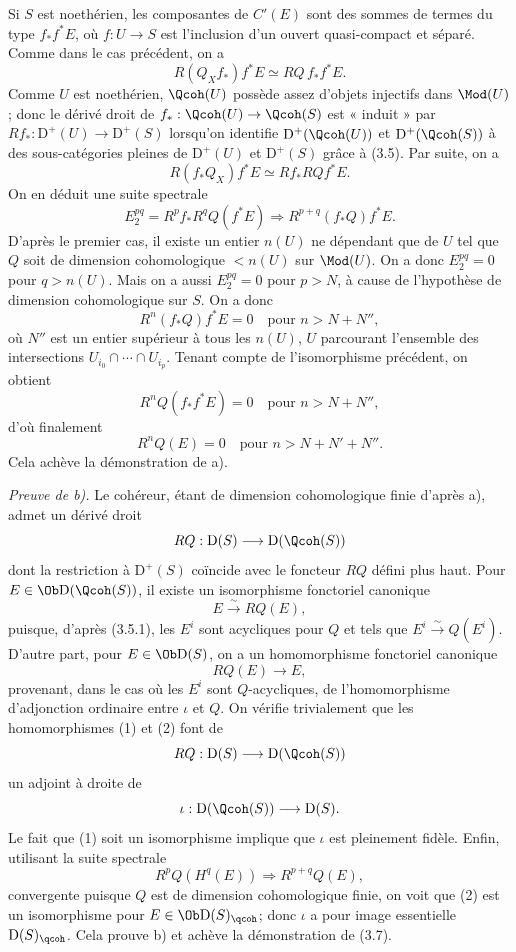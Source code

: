 \documentclass[11pt]{article}
\begin{document}
Si $S$ est noethérien, les composantes de $C'(E)$ sont des sommes de termes du type $f_*f^*E$, où $f:U\to S$ est l'inclusion d'un ouvert quasi-compact et séparé. Comme dans le cas précédent, on a
\[
 R(Q_Xf_*)f^*E\simeq RQ\,f_*f^*E.
\]
Comme $U$ est noethérien, $\Qcoh(U)$ possède assez d'objets injectifs dans $\Mod(U)$; donc le dérivé droit de $f_*:\Qcoh(U)\to\Qcoh(S)$ est « induit » par $Rf_*:\mathrm D^+(U)\to\mathrm D^+(S)$ lorsqu'on identifie $\mathrm D^+(\Qcoh(U))$ et $\mathrm D^+(\Qcoh(S))$ à des sous-catégories pleines de $\mathrm D^+(U)$ et $\mathrm D^+(S)$ grâce à (3.5). Par suite, on a
\[
 R(f_*Q_X)f^*E\simeq Rf_*RQf^*E.
\]
On en déduit une suite spectrale
\[
 E_2^{pq}=R^pf_*R^qQ(f^*E)\Longrightarrow R^{p+q}(f_*Q)f^*E.
\]
D'après le premier cas, il existe un entier $n(U)$ ne dépendant que de $U$ tel que $Q$ soit de dimension cohomologique $<n(U)$ sur $\Mod(U)$. On a donc $E_2^{pq}=0$ pour $q>n(U)$. Mais on a aussi $E_2^{pq}=0$ pour $p>N$, à cause de l'hypothèse de dimension cohomologique sur $S$. On a donc
\[
 R^n(f_*Q)f^*E=0\quad\text{pour }n>N+N'',
\]
où $N''$ est un entier supérieur à tous les $n(U)$, $U$ parcourant l'ensemble des intersections $U_{i_0}\cap\cdots\cap U_{i_p}$. Tenant compte de l'isomorphisme précédent, on obtient
\[
 R^nQ(f_*f^*E)=0\quad\text{pour }n>N+N'',
\]
d'où finalement
\[
 R^nQ(E)=0\quad\text{pour }n>N+N'+N''.
\]
Cela achève la démonstration de a).

\emph{Preuve de b).} Le cohéreur, étant de dimension cohomologique finie d'après a), admet un dérivé droit
\[
 RQ:\mathrm D(S)\longrightarrow\mathrm D(\Qcoh(S))
\]
dont la restriction à $\mathrm D^+(S)$ coïncide avec le foncteur $RQ$ défini plus haut. Pour $E\in\Ob\mathrm D(\Qcoh(S))$, il existe un isomorphisme fonctoriel canonique
\begin{equation}\tag{1}
 E\xrightarrow{\sim}RQ(E),
\end{equation}
puisque, d'après (3.5.1), les $E^i$ sont acycliques pour $Q$ et tels que $E^i\xrightarrow{\sim}Q(E^i)$. D'autre part, pour $E\in\Ob\mathrm D(S)$, on a un homomorphisme fonctoriel canonique
\begin{equation}\tag{2}
 RQ(E)\longrightarrow E,
\end{equation}
provenant, dans le cas où les $E^i$ sont $Q$-acycliques, de l'homomorphisme d'adjonction ordinaire entre $\iota$ et $Q$. On vérifie trivialement que les homomorphismes (1) et (2) font de
\[
 RQ:\mathrm D(S)\longrightarrow\mathrm D(\Qcoh(S))
\]
un adjoint à droite de
\[
 \iota:\mathrm D(\Qcoh(S))\longrightarrow\mathrm D(S).
\]
Le fait que (1) soit un isomorphisme implique que $\iota$ est pleinement fidèle. Enfin, utilisant la suite spectrale
\[
 R^pQ(H^q(E))\Longrightarrow R^{p+q}Q(E),
\]
convergente puisque $Q$ est de dimension cohomologique finie, on voit que (2) est un isomorphisme pour $E\in\Ob\mathrm D(S)_{\qcoh}$; donc $\iota$ a pour image essentielle $\mathrm D(S)_{\qcoh}$. Cela prouve b) et achève la démonstration de (3.7).
\end{document}
